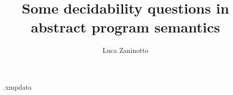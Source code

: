 
\newcommand{\myName}{Luca Zaninotto}
\newcommand{\myTitle}{\large Some decidability questions in abstract program semantics}
\newcommand{\myDegree}{Master degree thesis}
\newcommand{\myUni}{University of Padova}
\newcommand{\myFaculty}{Master degree in Computer Science}
\newcommand{\myDepartment}{Department of Mathematics ``Tullio Levi-Civita''}
\newcommand{\profTitle}{Prof.}
\newcommand{\myProf}{Paolo Baldan} %
\newcommand{\myCoProf}{Francesco Ranzato} %
\newcommand{\myLocation}{Padova}
\newcommand{\myAA}{2023-2024}
\newcommand{\myTime}{February}

\title{\myTitle}
\author{\myName}

\begin{filecontents*}{\jobname.xmpdata}
\end{filecontents*}

